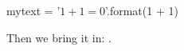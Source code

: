\documentclass[12pt]{scrartcl}
\begin{document}
\begin{pyblock}
mytext = '$1 + 1 = {0}$'.format(1 + 1)
\end{pyblock}

Then we bring it in:  .
\end{document}
